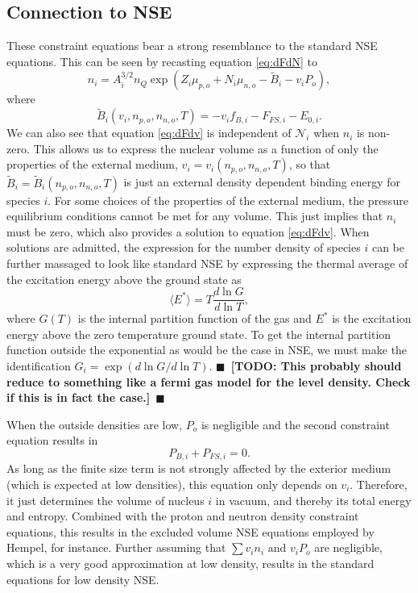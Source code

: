 \documentclass[11pt,letter]{article}
\newcommand{\todo}[1]{{$\blacksquare$~\textbf{\color{blue}[TODO: #1]}}~$\blacksquare$}
\begin{document}
\subsection{Connection to NSE} 
These constraint equations bear a strong resemblance to the standard NSE 
equations.  This can be seen by recasting equation \ref{eq:dFdN} to 
\begin{equation*}
n_i = A_i^{3/2} n_Q \exp(Z_i \mu_{p,o} + N_i \mu_{n,o} - \tilde B_i - v_i P_o),
\end{equation*}
where 
\begin{equation*}
\tilde B_i(v_i, n_{p,o}, n_{n,o}, T) = 
-v_i f_{B,i} - F_{FS,i} - E_{0,i}.
\end{equation*}
We can also see that equation \ref{eq:dFdv} is independent of $\mathcal{N}_i$ 
when $n_i$ is non-zero.  This allows us to express the nuclear volume as a 
function of only the properties of the external medium, $v_i = v_i(n_{p,o},
n_{n,o}, T)$, so that $\tilde B_i = \tilde B_i(n_{p,o}, n_{n,o}, T)$ is just 
an external density dependent binding energy for species $i$.  For some choices 
of the properties of the external medium, the pressure equilibrium conditions 
cannot be met for any volume.  This just implies that $n_i$ must be zero, which 
also provides a solution to equation \ref{eq:dFdv}.  When solutions are admitted, 
the expression for the number density of species $i$ can be further massaged to look like standard NSE by expressing the thermal average 
of the excitation energy above the ground state as 
\begin{equation*}
\langle E^* \rangle = T \frac{d \ln G}{d \ln T},
\end{equation*} 
where $G(T)$ is the internal partition function of the gas and $E^*$ is the 
excitation energy above the zero temperature ground state.  To get the 
internal partition function outside the exponential as would be the case in 
NSE, we must make the identification $ G_i = \exp(d \ln G/ d\ln T)$.  
\todo{This probably should reduce to something like a fermi gas model for the 
level density.  Check if this is in fact the case.}

When the outside densities are low, $P_o$ is negligible and the second
constraint equation results in \begin{equation*}
P_{B,i} + P_{FS,i} = 0.
\end{equation*} 
As long as the finite size term is not strongly affected by the exterior medium
(which is expected at low densities), this equation only depends on $v_i$.
Therefore, it just determines the volume of nucleus $i$ in vacuum, and thereby
its total energy and entropy.  Combined with the proton and neutron density 
constraint equations, this results in the excluded volume NSE equations employed 
by Hempel, for instance.  Further assuming that $\sum v_i n_i$ and $v_i P_o$ are 
negligible, which is a very good approximation at low density, results in the
standard equations for low density NSE.
\end{document}

